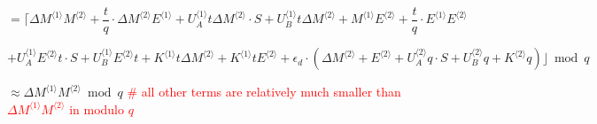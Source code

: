 \begin{enumerate}
$ = \Big\lceil \Delta M^{\langle 1 \rangle} M^{\langle 2 \rangle} +  \dfrac{t}{q}\cdot \Delta M^{\langle 2 \rangle} E^{\langle 1 \rangle} + U_A^{\langle 1 \rangle}t \Delta M^{\langle 2 \rangle} \cdot S + U_B^{\langle 1 \rangle}t\Delta M^{\langle 2\rangle}  + M^{\langle 1 \rangle} E^{\langle 2 \rangle} + \dfrac{t}{q}\cdot E^{\langle 1 \rangle} E^{\langle 2 \rangle} $

\text{ } \text{ } $+ U_A^{\langle 1 \rangle}  E^{\langle 2 \rangle}t\cdot S + U_B^{\langle 1 \rangle} E^{\langle 2 \rangle}t + K^{\langle 1 \rangle}t\Delta M^{\langle 2 \rangle} + K^{\langle 1 \rangle}t E^{\langle 2 \rangle} 
+ \epsilon_d\cdot(\Delta M^{\langle 2 \rangle} + E^{\langle 2 \rangle} + U_A^{\langle 2 \rangle}q \cdot S + U_B^{\langle 2 \rangle}q + K^{\langle 2 \rangle} q)\Big\rfloor \bmod q $ 

$ \approx \Delta M^{\langle 1 \rangle} M^{\langle 2 \rangle} \bmod q $ \textcolor{red}{ \# all other terms are relatively much smaller than $\Delta M^{\langle 1 \rangle} M^{\langle 2 \rangle}$ in modulo $q$}

$ $














\end{enumerate}

